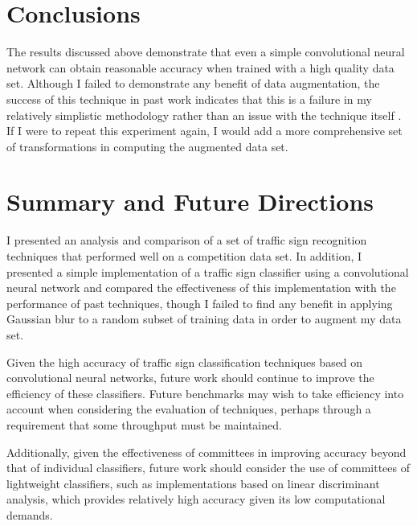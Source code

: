 \documentclass[letterpaper,twocolumn,10pt]{article}
\begin{document}
\section{Conclusions}

The results discussed above demonstrate that even a simple convolutional neural network can obtain reasonable accuracy when trained with a high quality data set. Although I failed to demonstrate any benefit of data augmentation, the success of this technique in past work indicates that this is a failure in my relatively simplistic methodology rather than an issue with the technique itself \cite{ciresan_committee_2011, sermanet_convolutional_2012}. If I were to repeat this experiment again, I would add a more comprehensive set of transformations in computing the augmented data set. 

\section{Summary and Future Directions}

I presented an analysis and comparison of a set of traffic sign recognition techniques that performed well on a competition data set. In addition, I presented a simple implementation of a traffic sign classifier using a convolutional neural network and compared the effectiveness of this implementation with the performance of past techniques, though I failed to find any benefit in applying Gaussian blur to a random subset of training data in order to augment my data set.

Given the high accuracy of traffic sign classification techniques based on convolutional neural networks, future work should continue to improve the efficiency of these classifiers. Future benchmarks may wish to take efficiency into account when considering the evaluation of techniques, perhaps through a requirement that some throughput must be maintained.

Additionally, given the effectiveness of committees in improving accuracy beyond that of individual classifiers, future work should consider the use of committees of lightweight classifiers, such as implementations based on linear discriminant analysis, which provides relatively high accuracy given its low computational demands.

{\footnotesize 
}
\end{document}
